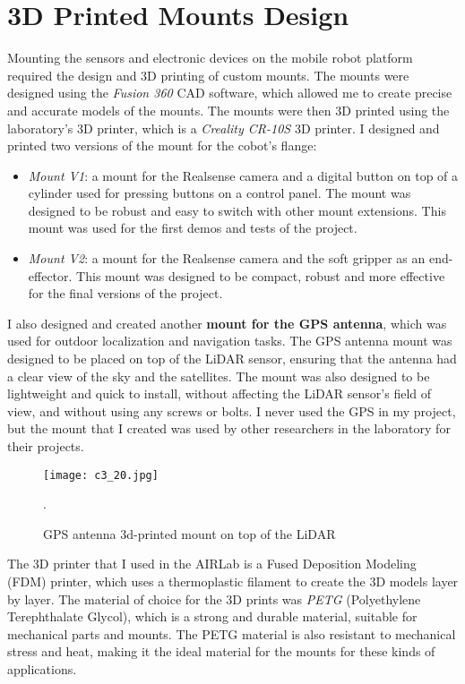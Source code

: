 \section{3D Printed Mounts Design}

Mounting the sensors and electronic devices on the mobile robot platform required the design and 3D printing
of custom mounts. The mounts were designed using the \textit{Fusion 360} CAD software, which allowed me to create
precise and accurate models of the mounts. The mounts were then 3D printed using the laboratory's 3D printer,
which is a \textit{Creality CR-10S} 3D printer. I designed and printed two versions of the mount for the
cobot's flange:

\begin{itemize}
    \item \textit{Mount V1}: a mount for the Realsense camera and a digital button on top of a cylinder used
    for pressing buttons on a control panel. The mount was designed to be robust and easy to switch with other
    mount extensions. This mount was used for the first demos and tests of the project.
    \item \textit{Mount V2}: a mount for the Realsense camera and the soft gripper as an end-effector.
    This mount was designed to be compact, robust and more effective for the final versions of the project.
\end{itemize}

I also designed and created another \textbf{mount for the GPS antenna}, which was used for outdoor localization
and navigation tasks. The GPS antenna mount was designed to be placed on top of the LiDAR sensor, ensuring
that the antenna had a clear view of the sky and the satellites. The mount was also designed to be lightweight
and quick to install, without affecting the LiDAR sensor's field of view, and without using any screws or bolts.
I never used the GPS in my project, but the mount that I created was used by other researchers in the laboratory
for their projects.

\begin{figure}[t]
    \centering
    \texttt{[image: c3\_20.jpg]}
    \captionsetup{width=1\linewidth}
    \caption{GPS antenna 3d-printed mount on top of the LiDAR}.
    \label{fig:c3_img20}
\end{figure}

The 3D printer that I used in the AIRLab is a Fused Deposition Modeling (FDM) printer,
which uses a thermoplastic filament to create the 3D models layer by layer. The material of choice
for the 3D prints was \textit{PETG} (Polyethylene Terephthalate Glycol), which is a strong and durable material,
suitable for mechanical parts and mounts. The PETG material is also resistant to mechanical stress and heat,
making it the ideal material for the mounts for these kinds of applications.

